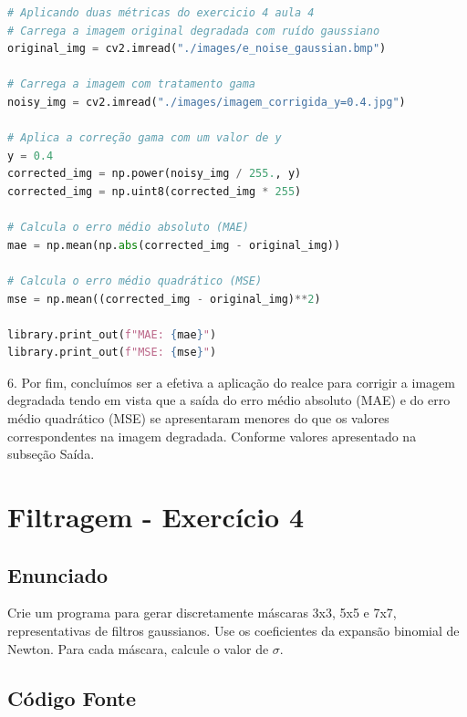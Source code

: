\documentclass[10pt,a4paper]{article}
\begin{document}
\begin{lstlisting}[language=Python]
# Aplicando duas métricas do exercicio 4 aula 4
# Carrega a imagem original degradada com ruído gaussiano
original_img = cv2.imread("./images/e_noise_gaussian.bmp")

# Carrega a imagem com tratamento gama
noisy_img = cv2.imread("./images/imagem_corrigida_y=0.4.jpg")

# Aplica a correção gama com um valor de y
y = 0.4
corrected_img = np.power(noisy_img / 255., y)
corrected_img = np.uint8(corrected_img * 255)

# Calcula o erro médio absoluto (MAE)
mae = np.mean(np.abs(corrected_img - original_img))

# Calcula o erro médio quadrático (MSE)
mse = np.mean((corrected_img - original_img)**2)

library.print_out(f"MAE: {mae}")
library.print_out(f"MSE: {mse}")
\end{lstlisting}

\begin{flushleft}
6.	Por fim, concluímos ser a efetiva a aplicação do realce para corrigir a imagem degradada tendo em vista que a saída do erro médio absoluto (MAE) e do erro médio quadrático (MSE)  se apresentaram menores do que os valores correspondentes na imagem degradada. Conforme valores apresentado na subseção Saída.
\end{flushleft}

\pagebreak

\section{Filtragem - Exercício 4}

\subsection{Enunciado}

\begin{flushleft}
Crie um programa para gerar discretamente máscaras 3x3, 5x5 e 7x7, representativas de filtros gaussianos. Use os coeficientes da expansão binomial de Newton. Para cada máscara, calcule o valor de \({\sigma}\).
\end{flushleft}

\subsection {Código Fonte}
\end{document}
